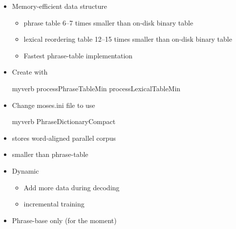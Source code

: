\documentclass[landscape]{uedslides2C}
\begin{document}

\begin{itemize}
\item Memory-efficient data structure
\begin{itemize}
\item phrase table 6--7 times smaller than on-disk binary table
\item lexical reordering table 12--15 times smaller than on-disk binary table
\item Fastest phrase-table implementation
\end{itemize}
\item Create with
\begin{center}
\begin{SaveVerbatim}{myverb} 
processPhraseTableMin
processLexicalTableMin
\end{SaveVerbatim}
\colorbox{gray}{}
\end{center}
\item Change moses.ini file to use
\begin{center}
\begin{SaveVerbatim}{myverb} 
PhraseDictionaryCompact
\end{SaveVerbatim}
\colorbox{gray}{}
\end{center}
\end{itemize}




\small
\begin{itemize}
  \item stores word-aligned parallel corpus
  \item smaller than phrase-table
  \item Dynamic
    \begin{itemize}
    \item Add more data during decoding
    \item incremental training
    \end{itemize}
  \item Phrase-base only (for the moment)
\end{itemize}
\end{document}
